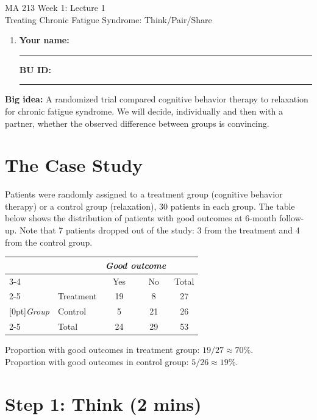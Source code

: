 \documentclass{article}
\newcommand{\coursenumber}{MA 213}
\newcommand{\weekplaceholder}{1}
\newcommand{\lectureplaceholder}{1}
\newcommand{\lecturetitle}{Treating Chronic Fatigue Syndrome: Think/Pair/Share}
\newcommand{\nameblank}{\rule{1.75in}{0.4pt}}
\newcommand{\idblank}{\rule{1.55in}{0.4pt}}
\begin{document}
\begin{center}
  {\LARGE \coursenumber{} Week \weekplaceholder{}: Lecture \lectureplaceholder{}}\\
  {\large \lecturetitle{}}
\end{center}

\begin{enumerate}[label=\arabic*.,leftmargin=*,itemsep=.7em]
  \item \textbf{Your name:} \nameblank \hfill \textbf{BU ID:} \idblank
\end{enumerate}

\textbf{Big idea:} A randomized trial compared cognitive behavior therapy to relaxation for chronic fatigue syndrome. We will decide, individually and then with a partner, whether the observed difference between groups is convincing.

\section*{The Case Study}

Patients were randomly assigned to a treatment group (cognitive behavior therapy) or a control group (relaxation), 30 patients in each group. The table below shows the distribution of patients with good outcomes at 6-month follow-up. Note that 7 patients dropped out of the study: 3 from the treatment and 4 from the control group.

\begin{center}
\begin{tabular}{ll cc c}
            &            & \multicolumn{2}{c}{\textit{Good outcome}} \\
\cline{3-4}
            &            & Yes    & No     & Total    \\
\cline{2-5}
                        &Treatment    & 19        & 8        & 27     \\
\raisebox{1.5ex}[0pt]{\textit{Group}}    &Control        & 5        & 21        & 26 \\
\cline{2-5}
                        &Total        & 24        & 29        & 53
\end{tabular}
\end{center}

Proportion with good outcomes in treatment group: $19/27 \approx 70\%$. \\
Proportion with good outcomes in control group: $5/26 \approx 19\%$.

\section*{Step 1: Think (2 mins)}
\end{document}

